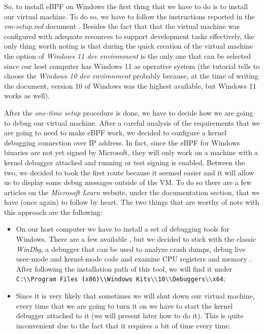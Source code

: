 So, to install eBPF on Windows the first thing that we have to do is to install our virtual machine.
To do so, we have to follow the instructions reported in the \textit{vm-setup.md} document \cite{WinVMSetupDoc}.
Besides the fact that that the virtual machine was configured with adequate resources to support development tasks effectively, the only thing worth noting is that during the quick creation of the virtual machine the option of \textit{Windows 11 dev environment} is the only one that can be selected since our host computer has Windows 11 as operative system (the tutorial tells to choose the \textit{Windows 10 dev environment} probably because, at the time of writing the document, version 10 of Windows was the highest available, but Windows 11 works as well).  

After the \textit{one-time setup} procedure is done, we have to decide how we are going to debug our virtual machine.
After a careful analysis of the requirements that we are going to need to make eBPF work, we decided to configure a kernel debugging connection over IP address.
In fact, since the eBPF for Windows binaries are not yet signed by Microsoft, they will only work on a machine with a kernel debugger attached and running or test signing is enabled.
Between the two, we decided to took the first route because it seemed easier and it will allow us to display some debug messages outside of the VM.
To do so there are a few articles on the \textit{Microsoft Learn} website, under the documentation section, that we have (once again) to follow by heart.
The two things that are worthy of note with this approach are the following:

\begin{itemize}
	\item 
		On our host computer we have to install a set of debugging tools for Windows.
		There are a few available \cite{DbgToolsWin}, but we decided to stick with the classic \textit{WinDbg}, a debugger that can be used to analyze crash dumps, debug live user-mode and kernel-mode code and examine CPU registers and memory \cite{InstallWinDbg}.
		After following the installation path of this tool, we will find it under \colorbox{backcolour}{\lstinline[style=commandline, language=bash, breaklines=true]|C:\\Program Files (x86)\\Windows Kits\\10\\Debuggers\\x64|};
	\item 
		Since it is very likely that sometimes we will shut down our virtual machine, every time that we are going to turn it on we have to start the kernel debugger attached to it (we will present later how to do it).
		This is quite inconvenient due to the fact that it requires a bit of time every time.  
\end{itemize}

